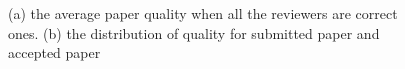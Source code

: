 \documentclass[11pt]{article}
\begin{document}
\begin{figure}[!th]
    \centering
    \qquad
    \caption{(a) the average paper quality when all the reviewers are correct ones. (b) the distribution of quality for submitted paper and accepted paper}
    \label{fig:cont}
\end{figure}
\end{document}
